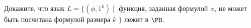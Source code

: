 Докажите, что язык $L = \{(\phi, 1^k) \mid$ функция, заданная формулой $\phi$, не может быть посчитана формулой размера $k$
$\}$ лежит в $\PH$.